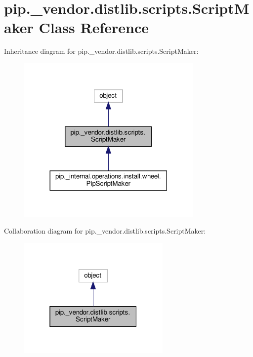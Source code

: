 \hypertarget{classpip_1_1__vendor_1_1distlib_1_1scripts_1_1ScriptMaker}{}\section{pip.\+\_\+vendor.\+distlib.\+scripts.\+Script\+Maker Class Reference}
\label{classpip_1_1__vendor_1_1distlib_1_1scripts_1_1ScriptMaker}


Inheritance diagram for pip.\+\_\+vendor.\+distlib.\+scripts.\+Script\+Maker\+:
\nopagebreak
\begin{figure}[H]
\begin{center}
\leavevmode
\includegraphics[width=257pt]{classpip_1_1__vendor_1_1distlib_1_1scripts_1_1ScriptMaker__inherit__graph}
\end{center}
\end{figure}


Collaboration diagram for pip.\+\_\+vendor.\+distlib.\+scripts.\+Script\+Maker\+:
\nopagebreak
\begin{figure}[H]
\begin{center}
\leavevmode
\includegraphics[width=211pt]{classpip_1_1__vendor_1_1distlib_1_1scripts_1_1ScriptMaker__coll__graph}
\end{center}
\end{figure}
